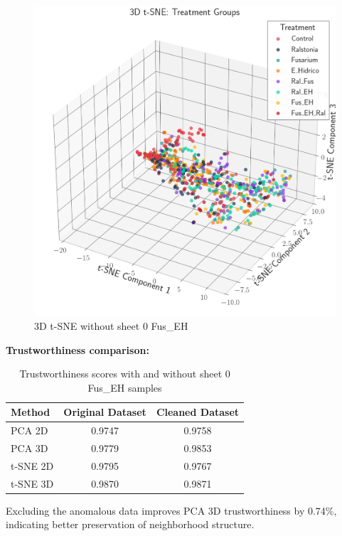 \documentclass[12pt,a4paper]{article}
\begin{document}
\begin{figure}
    \centering


    \includegraphics[width=\textwidth]{Plots/TSNE3D_Without_FusEH0.png}
    \caption{3D t-SNE without sheet 0 Fus\_EH}
    \label{fig:tsne3d_without_fus0}

\end{figure}

\textbf{Trustworthiness comparison:}

\begin{table}[H]
\centering
\caption{Trustworthiness scores with and without sheet 0 Fus\_EH samples}
\label{tab:trustworthiness_comparison}
\begin{tabular}{lcc}
\toprule
\textbf{Method} & \textbf{Original Dataset} & \textbf{Cleaned Dataset} \\
\midrule
PCA 2D & 0.9747 & 0.9758 \\
PCA 3D & 0.9779 & 0.9853 \\
t-SNE 2D & 0.9795 & 0.9767 \\
t-SNE 3D & 0.9870 & 0.9871 \\
\bottomrule
\end{tabular}
\end{table}

Excluding the anomalous data improves PCA 3D trustworthiness by 0.74\%, indicating better preservation of neighborhood structure.
\end{document}
